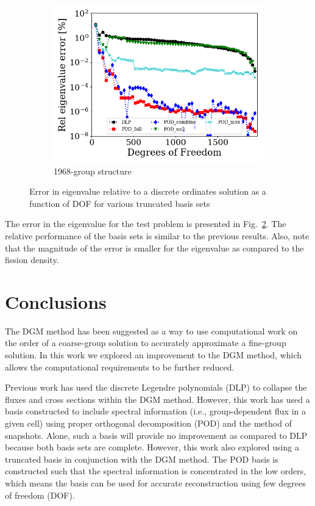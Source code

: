 \documentclass[5p,times,twocolumn,10pt]{elsarticle}
\newcommand{\FIG}[1]{Fig.~\ref{#1}}               %
\begin{document}
\begin{figure}[!htbp]
\begin{subfigure}[b]{\columnwidth}
            \centering
            \includegraphics[scale=0.55]{figures/k_error_1968}
            \caption{1968-group structure}
            \label{fig:k1968}
        \end{subfigure}
        \caption{Error in eigenvalue relative to a discrete ordinates solution as a function of DOF for various truncated basis sets}
        \label{fig:k}
    \end{figure}

    The error in the eigenvalue for the test problem is presented in \FIG{fig:k}.
    The relative performance of the basis sets is similar to the previous results.
    Also, note that the magnitude of the error is smaller for the eigenvalue as compared to the fission density.

    \section{Conclusions}
    The DGM method has been suggested as a way to use computational work on the order of a coarse-group solution to accurately approximate a fine-group solution.
    In this work we explored an improvement to the DGM method, which allows the computational requirements to be further reduced.

    Previous work has used the discrete Legendre polynomials (DLP) to collapse the fluxes and cross sections within the DGM method.
    However, this work has used a basis constructed to include spectral information (i.e., group-dependent flux in a given cell) using proper orthogonal decomposition (POD) and the method of snapshots.
    Alone, such a basis will provide no improvement as compared to DLP because both basis sets are complete.
    However, this work also explored using a truncated basis in conjunction with the DGM method.
    The POD basis is constructed such that the spectral information is concentrated in the low orders, which means the basis can be used for accurate reconstruction using few degrees of freedom (DOF).
\end{document}
